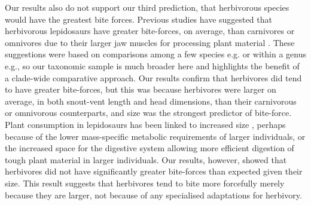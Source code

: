 \documentclass[a4paper, 12pt]{article}
\begin{document}
Our results also do not support our third prediction, that herbivorous species would have the greatest bite forces.
Previous studies have suggested that herbivorous lepidosaurs have greater bite-forces, on average, than carnivores or omnivores due to their larger jaw muscles for processing plant material \cite{metzger2005correlations,cooper2002distribution,herrel1999morphology,herrel1999sexual,herrel2004omnivory,Herrel2008,herrel2014does}.
These suggestions were based on comparisons among a few species e.g.\cite{herrel2014does,herrel2004omnivory} or within a genus e.g.\cite{lopez2015sex}, so our taxonomic sample is much broader here and highlights the benefit of a clade-wide comparative approach. 
Our results confirm that herbivores did tend to have greater bite-forces, but this was because herbivores were larger on average, in both snout-vent length and head dimensions, than their carnivorous or omnivorous counterparts, and size was the strongest predictor of bite-force. 
Plant consumption in lepidosaurs has been linked to increased size \cite{cooper2002distribution,herrel2014does,metzger2005correlations}, perhaps because of the lower mass-specific metabolic requirements of larger individuals, or the increased space for the digestive system allowing more efficient digestion of tough plant material in larger individuals\cite{herrel2014does,espinoza2004recurrent}.
Our results, however, showed that herbivores did not have significantly greater bite-forces than expected given their size. This result suggests that herbivores tend to bite more forcefully merely because they are larger, not because of any specialised adaptations for herbivory. 
\end{document}
